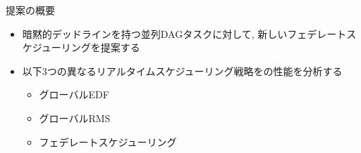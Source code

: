 
\begin{frame}{提案の概要}
    \begin{itemize}
        \item 暗黙的デッドラインを持つ並列DAGタスクに対して, 新しいフェデレートスケジューリングを提案する
        \item 以下3つの異なるリアルタイムスケジューリング戦略をの性能を分析する
        \begin{itemize}
            \item グローバルEDF
            \item グローバルRMS
            \item フェデレートスケジューリング
        \end{itemize}
    \end{itemize}
\end{frame}

